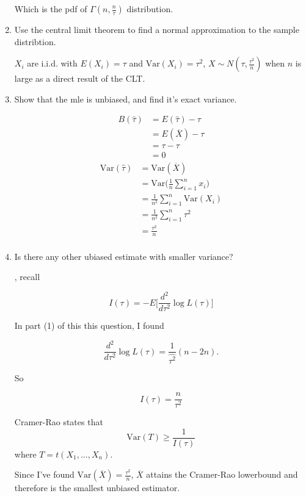 \documentclass{tufte-book}
\newcommand{\Var}{\mathrm{Var}}
\theoremstyle{mytheoremstyle}
\theoremstyle{mylemstyle}
\theoremstyle{mydefstyle}
\begin{document}
\begin{enumerate}
Which is the pdf of $\Gamma(n, \frac{n}{\tau})$ distribution.

\item Use the central limit theorem to find a normal approximation to the sample distribtion.

 $X_i$ are i.i.d. with $E(X_i) = \tau$ and $\Var(X_i)=\tau^2$, $X \sim N(\tau, \frac{\tau^2}{n})$ when $n$ is large as a direct result of the CLT.

\item Show that the mle is unbiased, and find it's exact variance.

\begin{align*}
B(\hat{\tau}) &= E(\hat{\tau}) - \tau\\
&= E(\overline{X}) - \tau \\
&= \tau - \tau \\
&= 0
\end{align*}
\begin{align*}
\Var(\hat{\tau}) &= \Var(\overline{X})\\
&= \Var\Big( \frac{1}{n} \sum_{i=1}^n x_i \Big)\\
&= \frac{1}{n^2} \sum_{i=1}^n \Var(X_i) \\
&= \frac{1}{n^2} \sum_{i=1}^n \tau^2 \\
&= \frac{\tau^2}{n}\\
\end{align*}

\item Is there any other ubiased estimate with smaller variance?

, recall

\[ I(\tau) = -E\Big[ \frac{d^2}{d\tau^2} \log L(\tau)\Big] \]

In part (1) of this this question, I found

\[\frac{d^2}{d\tau^2} \log L(\tau) = \frac{1}{\hat{\tau^2}}(n-2n). \]

So

\[ I(\tau) = \frac{n}{\tau^2} \]

Cramer-Rao states that 
\[\Var(T) \geq \frac{1}{I(\tau)} \]
where $T=t(X_1,...,X_n)$.

Since I've found $\Var(\overline{X}) = \frac{\tau^2}{n}$, $\overline{X}$ attains the Cramer-Rao lowerbound and therefore is the smallest unbiased estimator.
\end{enumerate}
\end{document}
